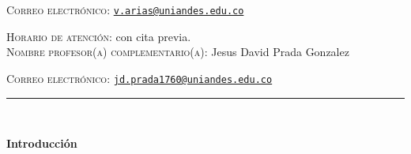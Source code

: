 \documentclass[letterpaper,10pt,onecolumn]{article}
\begin{document}
\noindent\textsc{Correo electr\'onico:}
\href{mailto:v.arias@uniandes.edu.co}{\nolinkurl{v.arias@uniandes.edu.co}}

\noindent\textsc{Horario de atenci\'on:} con cita previa. 
\\[-0.1cm]

\noindent\textsc{Nombre profesor(a) complementario(a):} 
Jesus David Prada Gonzalez

\noindent\textsc{Correo electr\'onico:}
\href{mailto: jd.prada1760@uniandes.edu.co}{\nolinkurl{jd.prada1760@uniandes.edu.co}}






\noindent\rule{\textwidth}{1pt}\\[-0.1cm]

\addtocounter{mysection}{1}

\noindent\textbf{\large {} \quad Introducci\'on}\\[-0.2cm]

\end{document}
